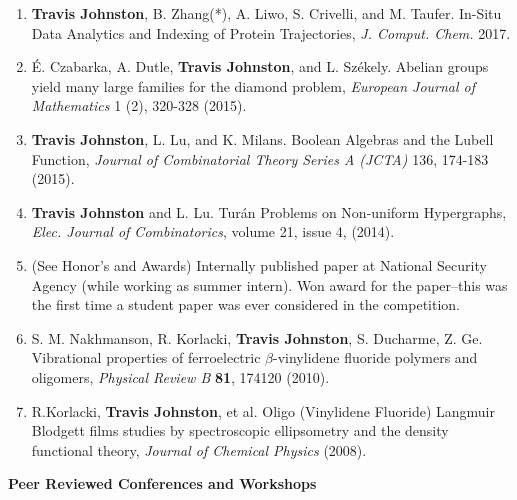 \documentclass{article}
\begin{document}
\begin{enumerate}[1.]
		\item \textbf{Travis Johnston}, B. Zhang(*), A. Liwo, S. Crivelli, and M. Taufer.  In-Situ Data Analytics and Indexing of Protein Trajectories, 
		\textit{J. Comput. Chem.} 2017.


		\item \'{E}. Czabarka, A. Dutle, \textbf{Travis Johnston}, and L. Sz\'{e}kely. Abelian groups yield many large families for the diamond problem,
		\textit{European Journal of Mathematics} 1 (2), 320-328 (2015).
		

		\item \textbf{Travis Johnston}, L. Lu, and K. Milans.  Boolean Algebras and the Lubell Function,
		\textit{Journal of Combinatorial Theory Series A (JCTA)} 136, 174-183 (2015).
		

		\item \textbf{Travis Johnston} and L. Lu. Tur\'an Problems on Non-uniform Hypergraphs,
		\textit{Elec. Journal of Combinatorics}, volume 21, issue 4, (2014).


		\item (See Honor's and Awards) Internally published paper at National Security Agency (while working as summer intern).
		Won award for the paper--this was the first time a student paper was ever considered in the competition.

		
		\item S. M. Nakhmanson, R. Korlacki, \textbf{Travis Johnston}, S. Ducharme, Z. Ge. Vibrational properties of ferroelectric $\beta$-vinylidene fluoride polymers and oligomers,
		\textit{Physical Review B} \textbf{81}, 174120 (2010). 


		\item R.Korlacki, \textbf{Travis Johnston}, et al. Oligo (Vinylidene Fluoride) Langmuir Blodgett films studies by spectroscopic ellipsometry and the density functional theory,
		\textit{Journal of Chemical Physics} (2008).

	\end{enumerate}

\noindent \Large \textbf{Peer Reviewed Conferences and Workshops} \normalsize

\medskip
\end{document}
